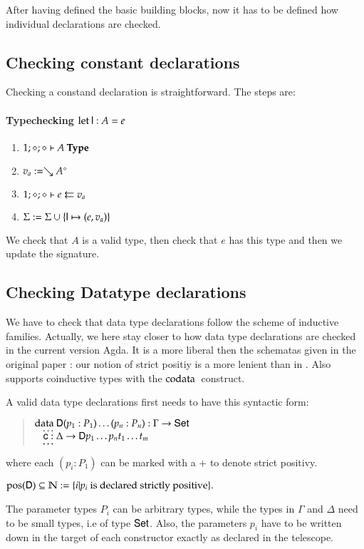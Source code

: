 After having defined the basic building blocks, now it has to be defined how individual declarations are checked.
\subsection{Checking constant declarations}
Checking a constand declaration is straightforward.
The steps are:
\paragraph*{Typechecking $\clet \dd : A = e $}
\begin{enumerate}
\item
$\IsType{1}{\diamond}{\diamond}{A}$
\item
$ v_a := \wh \cl{A}{\diamond}$
\item
$\Check{1}{\diamond}{\diamond}{e}{v_a}$
\item
$\Sig := \Sig \cup \{\dd \mapsto (e,v_a)\}$
\end{enumerate}
We check that $A$ is a valid type, then check that $e$ has this type and then we update the signature.
\subsection{Checking Datatype declarations}
We have to check that data type declarations follow the scheme of inductive families.
Actually, we here stay closer to how data type declarations are checked in the current version Agda.
It is a more liberal then the schematas given in the original paper \cite{dubjier}: our notion of strict positiy is a more lenient than in \cite{dubjier}.
Also \mugda supports coinductive types with the $\codata$ construct.

A valid data type declarations first needs to have this syntactic form:
\begin{quote}
$\data \DD ( p_1 : P_1) \ldots ( p_n : P_n) : \Gamma \ra \Set $\\
$\spc \ldots$\\
$\spc \cc : \Delta \ra \DD p_1 \ldots p_n t_1 \ldots t_m$\\
$\spc \ldots$\\   
\end{quote}
\newcommand{\pos}{\mbox{pos}}
where each $(p_i : P_1) $ can be marked with a $+$ to denote strict positivy.
\begin{definition}
$\pos(\DD) \subseteq \cN := \{ i \vert p_i \mbox{ is declared strictly positive} \}. $ 
\end{definition}
The parameter types $P_i$ can be arbitrary types, while the types in $\Gamma$ and $\Delta$ need to be small types, i.e of type $\Set$. Also, the parameters $p_i$ have to be written down in the target of each constructor exactly as declared in the telescope.

